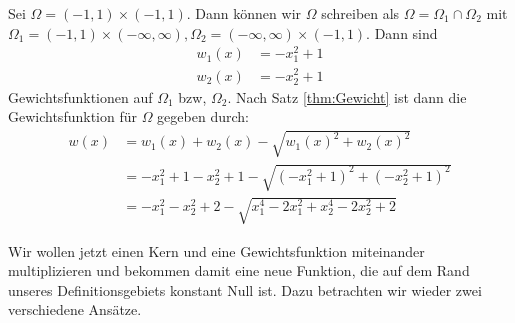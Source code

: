 \begin{example}
\label{ex:Gewicht}
Sei $\Omega = (-1,1) \times (-1,1)$. Dann können wir $\Omega$ schreiben als $\Omega = \Omega_1  \cap \Omega_2$ mit $\Omega_1 = (-1,1) \times (- \infty, \infty), \Omega_2 =   (- \infty, \infty) \times (-1,1)$.
Dann sind 
\begin{align*}
w_1(x) &= -x_1^2 +1\\
w_2(x) &= -x_2^2 +1 
\end{align*}
Gewichtsfunktionen auf $\Omega_1$ bzw, $\Omega_2$. Nach Satz \ref{thm:Gewicht} ist dann die Gewichtsfunktion für $\Omega$ gegeben durch:
\begin{align*}
w(x) &= w_1(x) + w_2(x) - \sqrt{w_1(x)^2 + w_2(x)^2}\\
&= -x_1^2 +1 -x_2^2 +1 - \sqrt{(-x_1^2+1)^2 + (-x_2^2+1)^2}\\
&= -x_1^2-x_2^2+2 - \sqrt{x_1^4 -2x_1^2 + x_2^4 -2x_2^2+2}
\end{align*}
\end{example}
Wir wollen jetzt einen Kern und eine Gewichtsfunktion miteinander multiplizieren und bekommen damit eine neue Funktion, die auf dem Rand unseres Definitionsgebiets konstant Null ist. Dazu betrachten wir wieder zwei verschiedene Ansätze.

